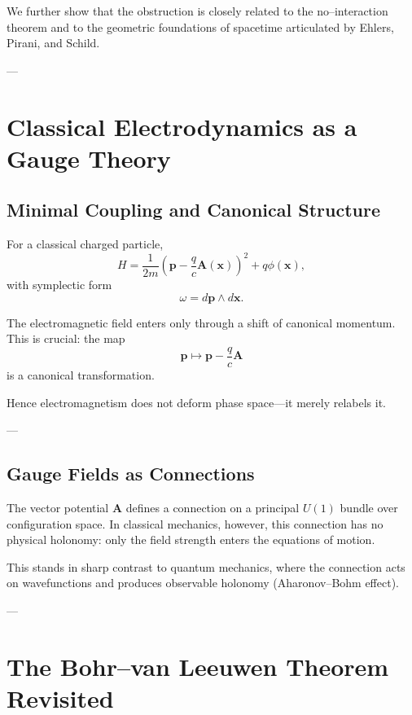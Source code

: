 \documentclass[11pt]{article}
\begin{document}
We further show that the obstruction is closely related to the no–interaction theorem and to the geometric foundations of spacetime articulated by Ehlers, Pirani, and Schild.

---

\section{Classical Electrodynamics as a Gauge Theory}

\subsection{Minimal Coupling and Canonical Structure}

For a classical charged particle,
\begin{equation}
H = \frac{1}{2m}\left( \mathbf{p} - \frac{q}{c}\mathbf{A}(\mathbf{x}) \right)^2 + q\phi(\mathbf{x}),
\end{equation}
with symplectic form
\begin{equation}
\omega = d\mathbf{p} \wedge d\mathbf{x}.
\end{equation}

The electromagnetic field enters only through a shift of canonical momentum. This is crucial: the map
\[
\mathbf{p} \mapsto \mathbf{p} - \frac{q}{c}\mathbf{A}
\]
is a canonical transformation.

Hence electromagnetism does not deform phase space—it merely relabels it.

---

\subsection{Gauge Fields as Connections}

The vector potential $\mathbf{A}$ defines a connection on a principal $U(1)$ bundle over configuration space. In classical mechanics, however, this connection has no physical holonomy: only the field strength enters the equations of motion.

This stands in sharp contrast to quantum mechanics, where the connection acts on wavefunctions and produces observable holonomy (Aharonov–Bohm effect).

---

\section{The Bohr–van Leeuwen Theorem Revisited}
\end{document}
